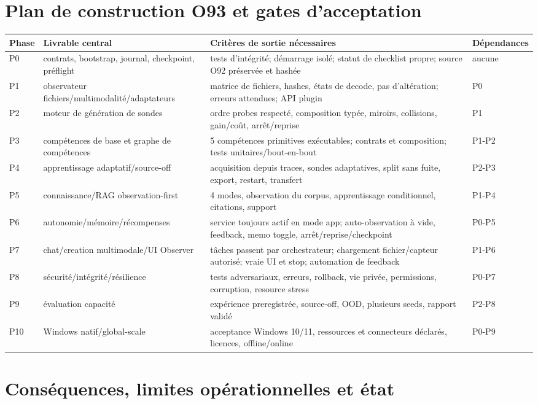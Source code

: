 \documentclass[11pt,a4paper,oneside]{report}
\begin{document}
\chapter{Plan de construction O93 et gates d'acceptation}
\begin{longtable}{p{1.3cm}p{4cm}p{6cm}p{3cm}}
\toprule
Phase & Livrable central & Critères de sortie nécessaires & Dépendances \\
\midrule
P0 & contrats, bootstrap, journal, checkpoint, préflight & tests d'intégrité; démarrage isolé; statut de checklist propre; source O92 préservée et hashée & aucune \\
P1 & observateur fichiers/multimodalité/adaptateurs & matrice de fichiers, hashes, états de decode, pas d'altération; erreurs attendues; API plugin & P0 \\
P2 & moteur de génération de sondes & ordre probes respecté, composition typée, miroirs, collisions, gain/coût, arrêt/reprise & P1 \\
P3 & compétences de base et graphe de compétences & 5 compétences primitives exécutables; contrats et composition; tests unitaires/bout-en-bout & P1-P2 \\
P4 & apprentissage adaptatif/source-off & acquisition depuis traces, sondes adaptatives, split sans fuite, export, restart, transfert & P2-P3 \\
P5 & connaissance/RAG observation-first & 4 modes, observation du corpus, apprentissage conditionnel, citations, support & P1-P4 \\
P6 & autonomie/mémoire/récompenses & service toujours actif en mode app; auto-observation à vide, feedback, memo toggle, arrêt/reprise/checkpoint & P0-P5 \\
P7 & chat/creation multimodale/UI Observer & tâches passent par orchestrateur; chargement fichier/capteur autorisé; vraie UI et stop; automation de feedback & P1-P6 \\
P8 & sécurité/intégrité/résilience & tests adversariaux, erreurs, rollback, vie privée, permissions, corruption, resource stress & P0-P7 \\
P9 & évaluation capacité & expérience preregistrée, source-off, OOD, plusieurs seeds, rapport validé & P2-P8 \\
P10 & Windows natif/global-scale & acceptance Windows 10/11, ressources et connecteurs déclarés, licences, offline/online & P0-P9 \\
\bottomrule
\end{longtable}

\chapter{Conséquences, limites opérationnelles et état}
\end{document}
